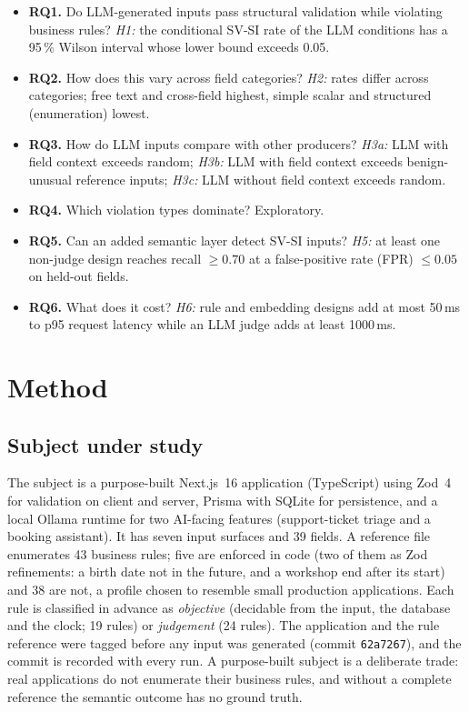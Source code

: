\documentclass[conference]{IEEEtran}
\begin{document}
\begin{itemize}
  \item \textbf{RQ1.} Do LLM-generated inputs pass structural validation while violating business
  rules? \emph{H1:} the conditional SV-SI rate of the LLM conditions has a 95\,\% Wilson interval whose
  lower bound exceeds 0.05.
  \item \textbf{RQ2.} How does this vary across field categories? \emph{H2:} rates differ across
  categories; free text and cross-field highest, simple scalar and structured (enumeration) lowest.
  \item \textbf{RQ3.} How do LLM inputs compare with other producers? \emph{H3a:} LLM with field
  context exceeds random; \emph{H3b:} LLM with field context exceeds benign-unusual reference inputs;
  \emph{H3c:} LLM without field context exceeds random.
  \item \textbf{RQ4.} Which violation types dominate? Exploratory.
  \item \textbf{RQ5.} Can an added semantic layer detect SV-SI inputs? \emph{H5:} at least one
  non-judge design reaches recall $\geq 0.70$ at a false-positive rate (FPR) $\leq 0.05$ on held-out
  fields.
  \item \textbf{RQ6.} What does it cost? \emph{H6:} rule and embedding designs add at most 50\,ms to
  p95 request latency while an LLM judge adds at least 1000\,ms.
\end{itemize}

\section{Method}
\label{sec:method}

\subsection{Subject under study}
The subject is a purpose-built Next.js~16 application (TypeScript) using Zod~4 for validation on
client and server, Prisma with SQLite for persistence, and a local Ollama runtime for two AI-facing
features (support-ticket triage and a booking assistant). It has seven input surfaces and 39 fields.
A reference file enumerates 43 business rules; five are enforced in code (two of them as Zod
refinements: a birth date not in the future, and a workshop end after its start) and 38 are not, a
profile chosen to resemble small production applications. Each rule is classified in advance as
\emph{objective} (decidable from the input, the database and the clock; 19 rules) or
\emph{judgement} (24 rules). The application and the rule reference were tagged before any input was
generated (commit \texttt{62a7267}), and the commit is recorded with every run. A purpose-built
subject is a deliberate trade: real applications do not enumerate their business rules, and without a
complete reference the semantic outcome has no ground truth.
\end{document}
